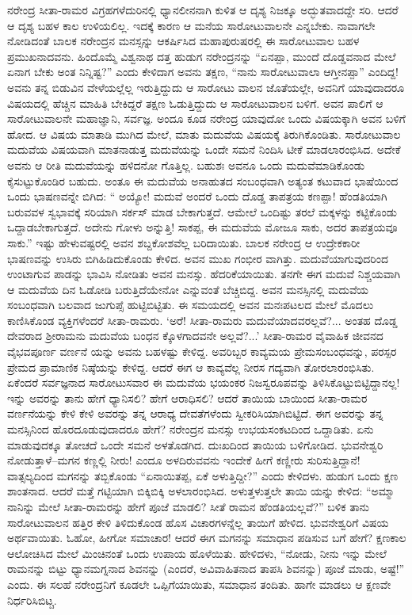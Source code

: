 ನರೇಂದ್ರ ಸೀತಾ-ರಾಮರ ವಿಗ್ರಹಗಳೆದುರಿನಲ್ಲಿ ಧ್ಯಾನಲೀನನಾಗಿ ಕುಳಿತ ಆ ದೃಶ್ಯ ನಿಜಕ್ಕೂ ಅದ್ಭುತವಾದದ್ದೇ ಸರಿ. ಆದರೆ ಆ ದೃಶ್ಯ ಬಹಳ ಕಾಲ ಉಳಿಯಲಿಲ್ಲ. ಇದಕ್ಕೆ ಕಾರಣ ಆ ಮನೆಯ ಸಾರೋಟುವಾಲನೇ ಎನ್ನಬೇಕು. ನಾವಾಗಲೇ ನೋಡಿದಂತೆ ಬಾಲಕ ನರೇಂದ್ರನ ಮನಸ್ಸನ್ನು ಆಕರ್ಷಿಸಿದ ಮಹಾಪುರುಷರಲ್ಲಿ ಈ ಸಾರೋಟುವಾಲ ಬಹಳ ಪ್ರಮುಖನಾದವನು. ಹಿಂದೊಮ್ಮೆ ವಿಶ್ವನಾಥ ದತ್ತ ಹುಡುಗ ನರೇಂದ್ರನನ್ನು “ಏನಪ್ಪಾ, ಮುಂದೆ ದೊಡ್ಡವನಾದ ಮೇಲೆ ಏನಾಗ ಬೇಕು ಅಂತ ನಿನ್ನಿಷ್ಟ?” ಎಂದು ಕೇಳಿದಾಗ ಅವನು ತಕ್ಷಣ, “ನಾನು ಸಾರೋಟುವಾಲಾ ಆಗ್ತೀನಪ್ಪಾ” ಎಂದಿದ್ದ! ಅವನು ತನ್ನ ಬಿಡುವಿನ ವೇಳೆಯಲ್ಲೆಲ್ಲ ಇರುತ್ತಿದ್ದುದು ಆ ಸಾರೋಟು ವಾಲನ ಜೊತೆಯಲ್ಲೇ, ಅವನಿಗೆ ಯಾವುದಾದರೂ ವಿಷಯದಲ್ಲಿ ಹೆಚ್ಚಿನ ಮಾಹಿತಿ ಬೇಕಿದ್ದರೆ ತಕ್ಷಣ ಓಡುತ್ತಿದ್ದುದು ಆ ಸಾರೋಟುವಾಲನ ಬಳಿಗೆ. ಅವನ ಪಾಲಿಗೆ ಆ ಸಾರೋಟುವಾಲನೇ ಮಹಾಜ್ಞಾನಿ, ಸರ್ವಜ್ಞ. ಅಂದೂ ಕೂಡ ನರೇಂದ್ರ ಯಾವುದೋ ಒಂದು ವಿಷಯಕ್ಕಾಗಿ ಅವನ ಬಳಿಗೆ ಹೋದ. ಆ ವಿಷಯ ಮಾತಾಡಿ ಮುಗಿದ ಮೇಲೆ, ಮಾತು ಮದುವೆಯ ವಿಷಯಕ್ಕೆ ತಿರುಗಿಕೊಂಡಿತು. ಸಾರೋಟುವಾಲ ಮದುವೆಯ ವಿಷಯವಾಗಿ ಮಾತನಾಡುತ್ತ ಮದುವೆಯನ್ನು ಒಂದೇ ಸಮನೆ ನಿಂದಿಸಿ ಟೀಕೆ ಮಾಡಲಾರಂಭಿಸಿದ. ಅದೇಕೆ ಅವನು ಆ ರೀತಿ ಮದುವೆಯನ್ನು ಹಳಿದನೋ ಗೊತ್ತಿಲ್ಲ. ಬಹುಶಃ ಅವನೂ ಒಂದು ಮದುವೆಮಾಡಿಕೊಂಡು ಕೈಸುಟ್ಟುಕೊಂಡಿರ ಬಹುದು. ಅಂತೂ ಈ ಮದುವೆಯ ಅನಾಹುತದ ಸಂಬಂಧವಾಗಿ ಅತ್ಯಂತ ಕಟುವಾದ ಭಾಷೆಯಿಂದ ಒಂದು ಭಾಷಣವನ್ನೇ ಬಿಗಿದ: “ ಅಯ್ಯೋ! ಮದುವೆ ಅಂದರೆ ಒಂದು ದೊಡ್ಡ ತಾಪತ್ರಯ ಕಣಪ್ಪಾ! ಹೆಂಡತಿಯಾಗಿ ಬರುವವಳ ಸ್ವಭಾವಕ್ಕೆ ಸರಿಯಾಗಿ ಸರ್ಕಸ್ ಮಾಡ ಬೇಕಾಗುತ್ತದೆ. ಆಮೇಲೆ ಒಂದಿಷ್ಟು ತರಲೆ ಮಕ್ಕಳನ್ನು ಕಟ್ಟಿಕೊಂಡು ಒದ್ದಾಡಬೇಕಾಗುತ್ತದೆ. ಅದೇನು ಗೋಳು ಅನ್ನುತ್ತಿ! ಸಾಕಪ್ಪ, ಈ ಮದುವೆಯ ಮೋಜೂ ಸಾಕು, ಅದರ ತಾಪತ್ರಯವೂ ಸಾಕು.” ಇಷ್ಟು ಹೇಳುವಷ್ಟರಲ್ಲಿ ಅವನ ಶಬ್ದಕೋಶವೆಲ್ಲ ಬರಿದಾಯಿತು. ಬಾಲಕ ನರೇಂದ್ರ ಆ ಉದ್ರೇಕಕಾರೀ ಭಾಷಣವನ್ನು ಉಸಿರು ಬಿಗಿಹಿಡಿದುಕೊಂಡು ಕೇಳಿದ. ಅವನ ಮುಖ ಗಂಭೀರ ವಾಗಿತ್ತು. ಮದುವೆಯಾಗುವುದರಿಂದ ಉಂಟಾಗುವ ಪಾಡನ್ನು ಭಾವಿಸಿ ನೋಡಿತು ಅವನ ಮನಸ್ಸು. ಹೆದರಿಕೆಯಾಯಿತು. ತನಗೇ ಈಗ ಮದುವೆ ನಿಶ್ಚಯವಾಗಿ ಆ ಮದುವೆಯ ದಿನ ಓಡೋಡಿ ಬರುತ್ತಿದೆಯೇನೋ ಎನ್ನುವಂತೆ ಬೆಚ್ಚಿಬಿದ್ದ. ಅವನ ಮನಸ್ಸಿನಲ್ಲಿ ಮದುವೆಯ ಸಂಬಂಧವಾಗಿ ಬಲವಾದ ಜುಗುಪ್ಸೆ ಹುಟ್ಟಿಬಿಟ್ಟಿತು. ಈ ಸಮಯದಲ್ಲಿ ಅವನ ಮನಃಪಟಲದ ಮೇಲೆ ಮೊದಲು ಕಾಣಿಸಿಕೊಂಡ ವ್ಯಕ್ತಿಗಳೆಂದರೆ ಸೀತಾ-ರಾಮರು. ‘ಅರೆ! ಸೀತಾ-ರಾಮರು ಮದುವೆಯಾದವರಲ್ಲವೆ?... ಅಂತಹ ದೊಡ್ಡ ದೇವರಾದ ಶ್ರೀರಾಮನು ಮದುವೆಯ ಬಂಧನ ಕ್ಕೊಳಗಾದವನೇ ಅಲ್ಲವೆ?...’ ಸೀತಾ-ರಾಮರ ವೈವಾಹಿಕ ಜೀವನದ ವೈಭವಪೂರ್ಣ ವರ್ಣನೆ ಯನ್ನು ಅವನು ಬಹಳಷ್ಟು ಕೇಳಿದ್ದ. ಅವರಿಬ್ಬರ ಕಾವ್ಯಮಯ ಪ್ರೇಮಸಂಬಂಧವನ್ನು, ಪರಸ್ಪರ ಪ್ರೇಮದ ಪ್ರಾಮಾಣಿಕ ನಿಷ್ಠೆಯನ್ನು ಕೇಳಿದ್ದ. ಆದರೆ ಈಗ ಆ ಕಾವ್ಯವೆಲ್ಲ ನೀರಸ ಗದ್ಯವಾಗಿ ತೋರಲಾರಂಭಿಸಿತು. ಏಕೆಂದರೆ ಸರ್ವಜ್ಞನಾದ ಸಾರೋಟುಸವಾರ ಈ ಮದುವೆಯ ಭಯಂಕರ ನಿಜಸ್ವರೂಪವನ್ನು ತಿಳಿಸಿಕೊಟ್ಟುಬಿಟ್ಟಿದ್ದಾನಲ್ಲ! ಇನ್ನು ಅವರನ್ನು ತಾನು ಹೇಗೆ ಧ್ಯಾನಿಸಲಿ? ಹೇಗೆ ಆರಾಧಿಸಲಿ? ಆದರೆ ತಾಯಿಯ ಬಾಯಿಂದ ಸೀತಾ-ರಾಮರ ವರ್ಣನೆಯನ್ನು ಕೇಳಿ ಕೇಳಿ ಅವರನ್ನು ತನ್ನ ಆರಾಧ್ಯ ದೇವತೆಗಳೆಂದು ಸ್ವೀಕರಿಸಿಯಾಗಿಬಿಟ್ಟಿದೆ. ಈಗ ಅವರನ್ನು ತನ್ನ ಮನಸ್ಸಿನಿಂದ ಹೊರದೂಡುವುದಾದರೂ ಹೇಗೆ? ನರೇಂದ್ರನ ಮನಸ್ಸು ಉಭಯಸಂಕಟದಿಂದ ಒದ್ದಾಡಿತು. ಏನು ಮಾಡುವುದಕ್ಕೂ ತೋಚದೆ ಒಂದೇ ಸಮನೆ ಅಳತೊಡಗಿದ. ದುಃಖದಿಂದ ತಾಯಿಯ ಬಳಿಗೋಡಿದ. ಭುವನೇಶ್ವರಿ ನೋಡುತ್ತಾಳೆ–ಮಗನ ಕಣ್ಣಲ್ಲಿ ನೀರು! ಎಂದೂ ಅಳದಿರುವವನು ಇಂದೇಕೆ ಹೀಗೆ ಕಣ್ಣೀರು ಸುರಿಸುತ್ತಿದ್ದಾನೆ! ವಾತ್ಸಲ್ಯದಿಂದ ಮಗನನ್ನು ತಬ್ಬಿಕೊಂಡು “ಏನಾಯಿತಪ್ಪ, ಏಕೆ ಅಳುತ್ತಿದ್ದೀ?” ಎಂದು ಕೇಳಿದಳು. ಹುಡುಗ ಒಂದು ಕ್ಷಣ ಶಾಂತನಾದ. ಆದರೆ ಮತ್ತೆ ಗಟ್ಟಿಯಾಗಿ ಬಿಕ್ಕಿಬಿಕ್ಕಿ ಅಳಲಾರಂಭಿಸಿದ. ಅಳುತ್ತಳುತ್ತಲೇ ತಾಯಿ ಯನ್ನು ಕೇಳಿದ: “ಅಮ್ಮಾ ನಾನಿನ್ನು ಮೇಲೆ ಸೀತಾ-ರಾಮರನ್ನು ಹೇಗೆ ಪೂಜೆ ಮಾಡಲಿ? ಸೀತೆ ರಾಮನ ಹೆಂಡತಿಯಲ್ಲವೆ?” ಬಳಿಕ ತಾನು ಸಾರೋಟುವಾಲನ ಹತ್ತಿರ ಕೇಳಿ ತಿಳಿದುಕೊಂಡ ಹೊಸ ವಿಚಾರಗಳನ್ನೆಲ್ಲ ತಾಯಿಗೆ ಹೇಳಿದ. ಭುವನೇಶ್ವರಿಗೆ ವಿಷಯ ಅರ್ಥವಾಯಿತು. ಓಹೋ, ಹೀಗೋ ಸಮಾಚಾರ! ಆದರೆ ಈಗ ಮಗನನ್ನು ಸಮಾಧಾನ ಪಡಿಸುವ ಬಗೆ ಹೇಗೆ? ಕ್ಷಣಕಾಲ ಆಲೋಚಿಸಿದ ಮೇಲೆ ಮಿಂಚಿನಂತೆ ಒಂದು ಉಪಾಯ ಹೊಳೆಯಿತು. ಹೇಳಿದಳು, “ನೋಡು, ನೀನು ಇನ್ನು ಮೇಲೆ ರಾಮನನ್ನು ಬಿಟ್ಟು ಧ್ಯಾನಮಗ್ನನಾದ ಶಿವನನ್ನು (ಎಂದರೆ, ಅವಿವಾಹಿತನಾದ ತಾಪಸಿ ಶಿವನನ್ನು) ಪೂಜೆ ಮಾಡು, ಅಷ್ಟೆ!” ಎಂದು. ಈ ಸಲಹೆ ನರೇಂದ್ರನಿಗೆ ಕೂಡಲೇ ಒಪ್ಪಿಗೆಯಾಯಿತು, ಸಮಾಧಾನ ತಂದಿತು. ಹಾಗೇ ಮಾಡಲು ಆ ಕ್ಷಣವೇ ನಿರ್ಧರಿಸಿಬಿಟ್ಚ.

